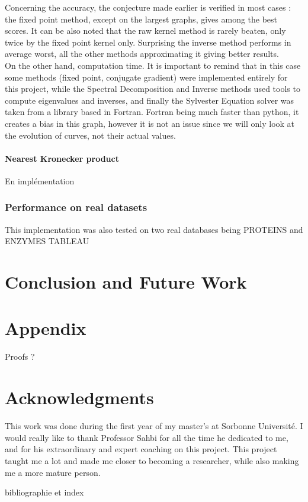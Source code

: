\documentclass{article}
\theoremstyle{definition}
\begin{document}
Concerning the accuracy, the conjecture made earlier is verified in most cases : the fixed point method, except on the largest graphs, gives among the best scores. It can be also noted that the raw kernel method is rarely beaten, only twice by the fixed point kernel only. Surprising the inverse method performs in average worst, all the other methods approximating it giving better results.\\
On the other hand, computation time. It is important to remind that in this case some methods (fixed point, conjugate gradient) were implemented entirely for this project, while the Spectral Decomposition and Inverse methods used tools to compute eigenvalues and inverses, and finally the Sylvester Equation solver was taken from a library based in Fortran. Fortran being much faster than python, it creates a bias in this graph, however it is not an issue since we will only look at the evolution of curves, not their actual values.
\paragraph{Nearest Kronecker product}
En implémentation

\subsubsection{Performance on real datasets}
This implementation was also tested on two real databases being PROTEINS and ENZYMES
TABLEAU

\section{Conclusion and Future Work}


\newpage
\appendix
\section{Appendix}
Proofs ?

\section*{Acknowledgments}
This work was done during the first year of my master's at Sorbonne Université. I would really like to thank Professor Sahbi for all the time he dedicated to me, and for his extraordinary and expert coaching on this project. This project taught me a lot and made me closer to becoming a researcher, while also making me a more mature person.
\listoffigures
\listoftables
bibliographie et index



\end{document}
